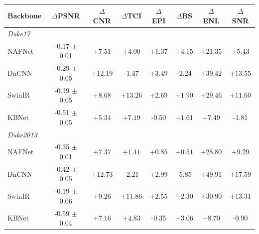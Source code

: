 \begin{tabular}{lccccccc}
\toprule
Backbone & $\Delta$PSNR & $\Delta$CNR & $\Delta$TCI & $\Delta$EPI & $\Delta$BS & $\Delta$ENL & $\Delta$SNR \\
\midrule
\multicolumn{8}{l}{\textit{Duke17}} \\
NAFNet & -0.17 $\pm$ 0.01 & $\mathbf{+7.51}$ & $\mathbf{+4.00}$ & $\mathbf{+1.37}$ & $\mathbf{+4.15}$ & $\mathbf{+21.35}$ & $\mathbf{+5.43}$ \\
DnCNN & -0.29 $\pm$ 0.05 & $\mathbf{+12.19}$ & -1.47 & $\mathbf{+3.49}$ & -2.24 & $\mathbf{+39.42}$ & $\mathbf{+13.55}$ \\
SwinIR & -0.19 $\pm$ 0.05 & $\mathbf{+8.68}$ & $\mathbf{+13.26}$ & $\mathbf{+2.69}$ & $\mathbf{+1.90}$ & $\mathbf{+29.46}$ & $\mathbf{+11.60}$ \\
KBNet & -0.51 $\pm$ 0.05 & $\mathbf{+5.34}$ & $\mathbf{+7.19}$ & -0.50 & $\mathbf{+1.61}$ & $\mathbf{+7.49}$ & -1.81 \\
\midrule
\multicolumn{8}{l}{\textit{Duke2013}} \\
NAFNet & -0.35 $\pm$ 0.01 & $\mathbf{+7.37}$ & $\mathbf{+1.41}$ & $\mathbf{+0.85}$ & $\mathbf{+0.51}$ & $\mathbf{+28.80}$ & $\mathbf{+9.29}$ \\
DnCNN & -0.42 $\pm$ 0.05 & $\mathbf{+12.73}$ & -2.21 & $\mathbf{+2.99}$ & -5.85 & $\mathbf{+49.91}$ & $\mathbf{+17.59}$ \\
SwinIR & -0.19 $\pm$ 0.06 & $\mathbf{+9.26}$ & $\mathbf{+11.86}$ & $\mathbf{+2.55}$ & $\mathbf{+2.30}$ & $\mathbf{+30.90}$ & $\mathbf{+13.31}$ \\
KBNet & -0.59 $\pm$ 0.04 & $\mathbf{+7.16}$ & $\mathbf{+4.83}$ & -0.35 & $\mathbf{+3.06}$ & $\mathbf{+8.70}$ & -0.90 \\
\bottomrule
\end{tabular}
